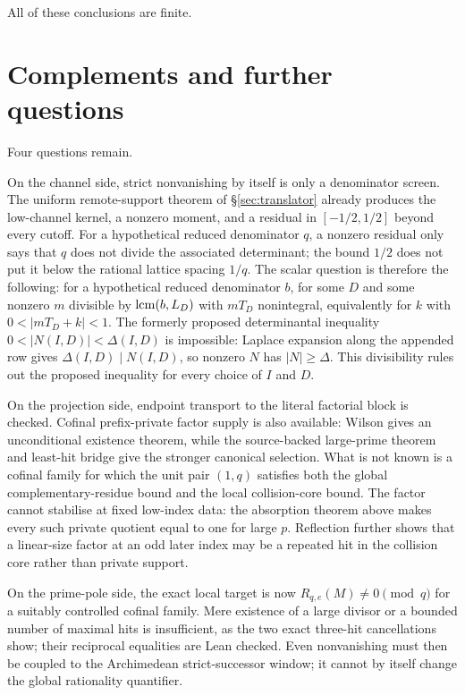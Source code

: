 \documentclass[11pt]{article}
\newcommand{\Lc}{L}
\begin{document}
All of these conclusions are finite.

\section{Complements and further questions}\label{sec:open}

Four questions remain.

On the channel side, strict nonvanishing by itself is only a denominator
screen.  The
uniform remote-support theorem of \S\ref{sec:translator} already produces the
low-channel kernel, a nonzero moment, and a residual in $[-1/2,1/2]$ beyond
every cutoff.  For a hypothetical reduced denominator $q$, a nonzero residual
only says that $q$ does not divide the associated determinant; the bound
$1/2$ does not put it below the rational lattice spacing $1/q$.  The scalar
question is therefore the following: for a
hypothetical reduced denominator $b$, for some $D$ and some nonzero $m$
divisible by $\lcm(b,\Lc_D)$ with $mT_D$ nonintegral, equivalently for $k$ with
$0<|mT_D+k|<1$.  The formerly proposed determinantal inequality
$0<|N(I,D)|<\Delta(I,D)$ is impossible: Laplace expansion along the appended
row gives $\Delta(I,D)\mid N(I,D)$, so nonzero $N$ has
$|N|\ge\Delta$.  This divisibility rules out the proposed inequality for every
choice of $I$ and $D$.

On the projection side, endpoint transport to the literal factorial block is
checked.  Cofinal prefix-private factor supply is also available: Wilson gives
an unconditional existence theorem, while the source-backed large-prime
theorem and least-hit bridge give the stronger canonical selection.  What is
not known is a cofinal family for which the unit pair $(1,q)$ satisfies both
the global complementary-residue bound and the local collision-core bound.
The factor cannot stabilise at fixed low-index data: the absorption theorem
above makes every such private quotient equal to one for large $p$.
Reflection further shows that a linear-size factor at an odd later index may
be a repeated hit in the collision core rather than private support.

On the prime-pole side, the exact local target is now
$R_{q,e}(M)\ne0\pmod q$ for a suitably controlled cofinal family.  Mere
existence of a large divisor or a bounded number of maximal hits is
insufficient, as the two exact three-hit cancellations show; their reciprocal
equalities are Lean checked.  Even
nonvanishing must then be coupled to the Archimedean strict-successor window;
it cannot by itself change the global rationality quantifier.
\end{document}
